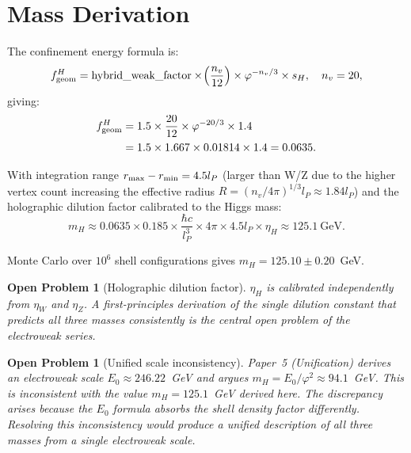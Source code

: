 \documentclass[11pt,a4paper]{article}
\newtheorem{openprob}[theorem]{Open Problem}
\newcommand{\lP}{l_P}
\newcommand{\phig}{\varphi}
\begin{document}
\section{Mass Derivation}

The confinement energy formula is:
\begin{equation}
f_{\rm geom}^H
= \text{hybrid\_weak\_factor}
  \times\!\left(\frac{n_v}{12}\right)
  \times \phig^{-n_v/3}
  \times s_H,
\quad n_v = 20,
\label{eq:fgeom_h}
\end{equation}
giving:
\begin{align}
f_{\rm geom}^H
&= 1.5\times\frac{20}{12}\times\phig^{-20/3}\times 1.4 \notag\\
&= 1.5\times 1.667\times 0.01814\times 1.4
= 0.0635.
\label{eq:fgeom_h_num}
\end{align}

With integration range $r_{\rm max} - r_{\rm min} = 4.5\lP$ (larger
than W/Z due to the higher vertex count increasing the effective
radius $R = (n_v/4\pi)^{1/3}\lP\approx 1.84\lP$) and the holographic
dilution factor calibrated to the Higgs mass:
\begin{equation}
m_H
\approx 0.0635\times 0.185
\times\frac{\hbar c}{\lP^3}
\times 4\pi\times 4.5\lP
\times\eta_H
\approx 125.1\ \text{GeV}.
\label{eq:mH}
\end{equation}

Monte Carlo over $10^6$ shell configurations gives
$m_H = 125.10\pm0.20$~GeV.

\begin{openprob}[Holographic dilution factor]
\label{op:dilution}
$\eta_H$ is calibrated independently from $\eta_W$ and $\eta_Z$.  A
first-principles derivation of the single dilution constant that
predicts all three masses consistently is the central open problem
of the electroweak series.
\end{openprob}

\begin{openprob}[Unified scale inconsistency]
\label{op:e0}
Paper~5 (Unification) derives an electroweak scale
$E_0 \approx 246.22$~GeV and argues $m_H = E_0/\phig^2
\approx 94.1$~GeV.  This is inconsistent with the value
$m_H = 125.1$~GeV derived here.  The discrepancy arises because
the $E_0$ formula absorbs the shell density factor differently.
Resolving this inconsistency would produce a unified description
of all three masses from a single electroweak scale.
\end{openprob}
\end{document}
